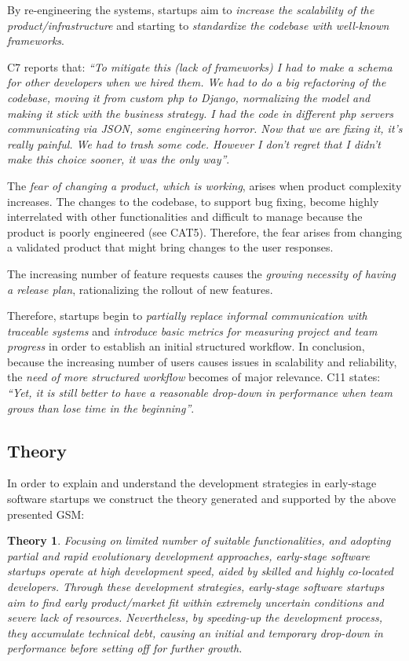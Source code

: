 \documentclass[10pt,journal,letterpaper,compsoc]{IEEEtran}
\newtheorem*{theory}{Theory}
\begin{document}
By re-engineering the systems, startups aim to \textit{increase the scalability 
of the product/infrastructure} and starting to \textit{standardize the codebase 
with well-known frameworks}.

C7 reports that: \textit{``To mitigate this (lack of frameworks) I had to make 
a schema for other developers when we hired them. We had to do a big 
refactoring of the codebase, moving it from custom php to Django, normalizing 
the model and making it stick with the business strategy. I had the code in 
different php servers communicating via JSON, some engineering horror. Now  that 
we are fixing it, it's really painful. We had to trash some code. However I 
don't regret that I didn't make this choice sooner, it was the only way''}.

The \textit{fear of changing a product, which is working}, arises when product 
complexity increases. The changes to the codebase, to support bug fixing, become 
highly interrelated with other functionalities and difficult to manage because 
the product is poorly engineered (see CAT5). Therefore, the fear arises from 
changing a validated product that might bring changes to the user responses.

The increasing number of feature requests causes the \textit{growing necessity 
of having a release plan}, rationalizing the rollout of new features.

Therefore, startups begin to \textit{partially replace informal communication 
with traceable systems} and \textit{introduce basic metrics for measuring 
project and team progress} in order to establish an initial structured workflow. 
In conclusion, because the increasing number of users causes issues in 
scalability and reliability, the \textit{need of more structured workflow} 
becomes of major relevance. C11 states: \textit{``Yet, it is still better to 
have a reasonable drop-down in performance when team grows than lose time in the 
beginning''}.
\subsection{Theory}
\label{res:gsm:th}
In order to explain and understand the development strategies in early-stage 
software startups we construct the theory generated and supported by the above 
presented GSM:

\begin{theory}
Focusing on limited number of suitable functionalities, and adopting partial 
and rapid evolutionary development approaches, early-stage software startups 
operate at high development speed, aided by skilled and highly co-located 
developers. Through these development strategies, early-stage software startups 
aim to find early product/market fit within extremely uncertain conditions and 
severe lack of resources. Nevertheless, by speeding-up the development process, 
they accumulate technical debt, causing an initial and temporary drop-down in 
performance before setting off for further growth.
\end{theory}
\end{document}
